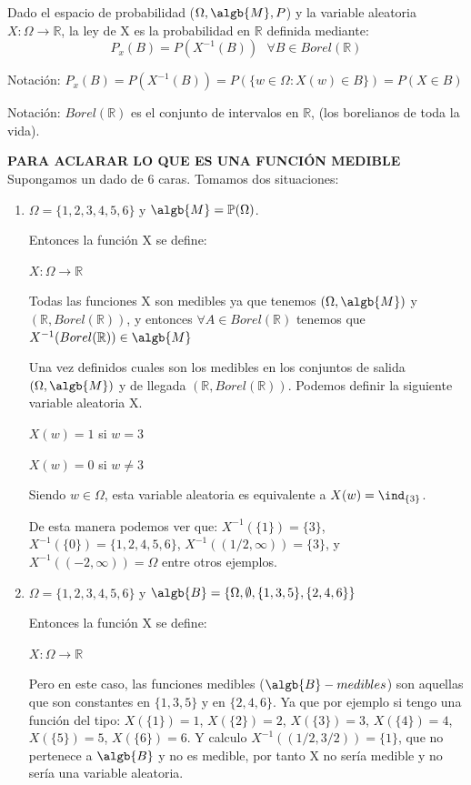 \documentclass{apuntes}
\begin{document}
\begin{defn}[ley de X]
Dado el espacio de probabilidad ($\Omega, \algb{M}, P$) y la variable aleatoria $X: \Omega \rightarrow \mathbb{R}$, la ley de X es la probabilidad en $\mathbb{R}$ definida mediante:
\[
P_x(B)=P(X^{-1}(B)) \text{ } \forall B \in Borel(\mathbb{R})
\]

Notación: $P_x(B) = P(X^{-1}(B)) = P(\{w \in \Omega : X(w) \in B\})=P(X \in B)$

Notación: $Borel(\mathbb{R})$ es el conjunto de intervalos en $\mathbb{R}$, (los borelianos de toda la vida).


\end{defn}


\begin{example}

\textbf{ PARA ACLARAR LO QUE ES UNA FUNCIÓN MEDIBLE }Supongamos un dado de 6 caras. Tomamos dos situaciones:
\begin{enumerate}
\item  $\Omega = \{1,2,3,4,5,6\}$ y $\algb{M}=\mathbb{P}(\Omega)$.

Entonces la función X se define:

$X: \Omega \rightarrow \mathbb{R}$

Todas las funciones X son medibles ya que tenemos $(\Omega,\algb{M})$ y $(\mathbb{R}, Borel(\mathbb{R}))$, y entonces $\forall A \in Borel(\mathbb{R})$ tenemos que $X^{-1}(Borel(\mathbb{R})) \in \algb{M}$

Una vez definidos cuales son los medibles en los conjuntos de salida $(\Omega,\algb{M})$ y de llegada $(\mathbb{R}, Borel(\mathbb{R}))$. Podemos definir la siguiente variable aleatoria X.

$X(w) = 1$ si $w=3$ 

$X(w) = 0$ si $w\neq3$

Siendo $w \in \Omega$, esta variable aleatoria es equivalente a $X(w) = \ind_{\{3\}}$.

De esta manera podemos ver que: $X^{-1}(\{1\}) = \{3\}$, $X^{-1}(\{0\}) = \{1,2,4,5,6\}$, $X^{-1}((1/2,\infty)) = \{3\}$, y $X^{-1}((-2,\infty)) = \Omega$ entre otros ejemplos.


\item $\Omega = \{1,2,3,4,5,6\}$ y $\algb{B} = \{\Omega, \emptyset, \{1,3,5\}, \{2,4,6\} \}$

Entonces la función X se define:

$X: \Omega \rightarrow \mathbb{R}$

Pero en este caso, las funciones medibles ($\algb{B}-medibles$) son aquellas que son constantes en $\{1,3,5\}$ y en $\{2,4,6\}$. Ya que por ejemplo si tengo una función del tipo: $X(\{1\})=1$, $X(\{2\})=2$, $X(\{3\})=3$, $X(\{4\})=4$, $X(\{5\})=5$, $X(\{6\})=6$. Y calculo $X^{-1}((1/2, 3/2))=\{1\}$, que no pertenece a $\algb{B}$ y no es medible, por tanto X no sería medible y no sería una variable aleatoria.
\end{enumerate}


\end{example}
\end{document}
